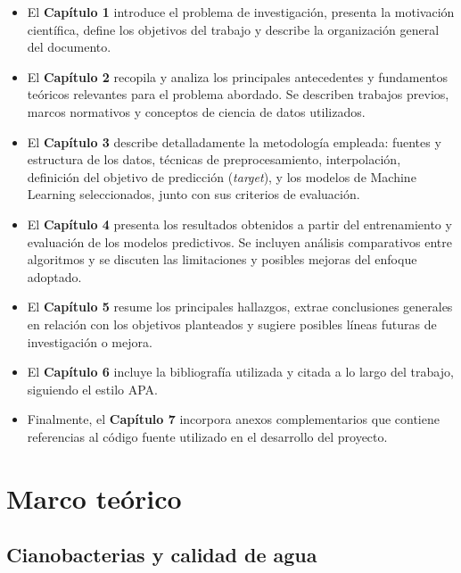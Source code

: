 \documentclass[
  11pt,
  pdftitle=TFI - Tschopp Joaquín S.,
  pdfauthor=Tschopp Joaquín S.,
  pdfcreator=LaTeX with hyperref,
]{report}  %
\begin{document}
\begin{itemize}
  \item El \textbf{Capítulo 1} introduce el problema de investigación, presenta la motivación científica, define los objetivos del trabajo y describe la organización general del documento.
  
  \item El \textbf{Capítulo 2} recopila y analiza los principales antecedentes y fundamentos teóricos relevantes para el problema abordado. Se describen trabajos previos, marcos normativos y conceptos de ciencia de datos utilizados.
  
  \item El \textbf{Capítulo 3} describe detalladamente la metodología empleada: fuentes y estructura de los datos, técnicas de preprocesamiento, interpolación, definición del objetivo de predicción (\textit{target}), y los modelos de Machine Learning seleccionados, junto con sus criterios de evaluación.
  
  \item El \textbf{Capítulo 4} presenta los resultados obtenidos a partir del entrenamiento y evaluación de los modelos predictivos. Se incluyen análisis comparativos entre algoritmos y se discuten las limitaciones y posibles mejoras del enfoque adoptado.
  
  \item El \textbf{Capítulo 5} resume los principales hallazgos, extrae conclusiones generales en relación con los objetivos planteados y sugiere posibles líneas futuras de investigación o mejora.
  
  \item El \textbf{Capítulo 6} incluye la bibliografía utilizada y citada a lo largo del trabajo, siguiendo el estilo APA.
  
  \item Finalmente, el \textbf{Capítulo 7} incorpora anexos complementarios que contiene referencias al código fuente utilizado en el desarrollo del proyecto.
\end{itemize}


\chapter{Marco teórico}

\section{Cianobacterias y calidad de agua}
\end{document}
